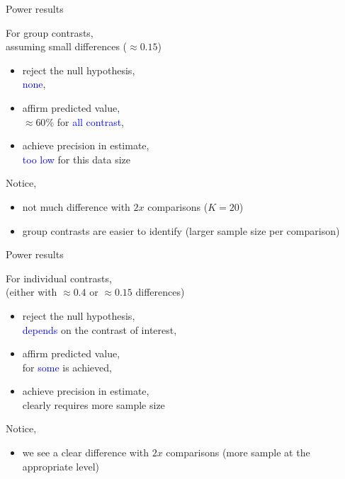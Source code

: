 %
%
\begin{lhframe}[rhgraphic={\texttt{[image: power\_result23.pdf]}}]
	{Power results} 
	
	For group contrasts, \\
	assuming small differences ($\approx 0.15$)
	\begin{itemize}
		\item reject the null hypothesis, \\
		\textcolor{blue}{none},
		\item affirm predicted value, \\
		$\approx 60\%$ for \textcolor{blue}{all contrast},
		\item achieve precision in estimate, \\
		\textcolor{blue}{too low} for this data size
	\end{itemize}
	
	Notice,
	\begin{itemize}
		\item not much difference with $2x$ comparisons ($K=20$)
		\item group contrasts are easier to identify {\small (larger sample size per comparison) }
	\end{itemize}
\end{lhframe}
%
%
\begin{lhframe}[rhgraphic={\texttt{[image: power\_result14.pdf]}}]
	{Power results} 
	
	For individual contrasts, \\
	(either with $\approx 0.4$ or $\approx 0.15$ differences)
	\begin{itemize}
		\item reject the null hypothesis, \\
		\textcolor{blue}{depends} on the contrast of interest,
		\item affirm predicted value, \\
		for \textcolor{blue}{some} is achieved,
		\item achieve precision in estimate, \\
		clearly requires more sample size
	\end{itemize}
	
	Notice,
	\begin{itemize}
		\item we see a clear difference with $2x$ comparisons {\small (more sample at the appropriate level) }
	\end{itemize}
\end{lhframe}
%
%

